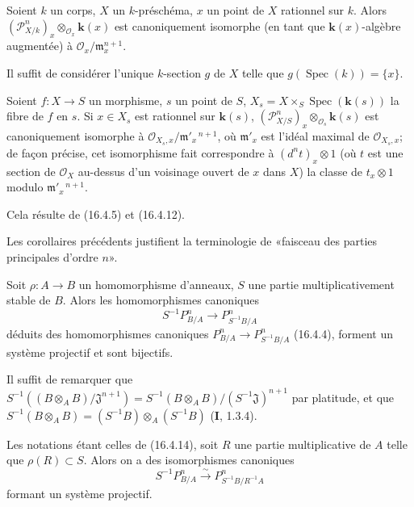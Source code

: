 \begin{corollary}[16.4.12]
\label{IV.16.4.12}
Soient $k$ un corps, $X$ un $k$-préschéma, $x$ un point de $X$ \textup{rationnel sur}
$k$. Alors $(\mathscr{P}_{X/k}^n)_x\otimes_{\mathcal{O}_x}\boldsymbol{k}(x)$ est
canoniquement isomorphe (en tant que $\boldsymbol{k}(x)$-algèbre augmentée) à
$\mathcal{O}_x/\mathfrak{m}_x^{n+1}$.
\end{corollary}

Il suffit de considérer l'unique $k$-section $g$ de $X$ telle que
$g(\operatorname{Spec}(k))=\{x\}$.

\begin{corollary}[16.4.13]
\label{IV.16.4.13}
Soient $f:X\to S$ un morphisme, $s$ un point de $S$,
$X_s=X\times_S\operatorname{Spec}(\boldsymbol{k}(s))$ la fibre de $f$ en $s$. Si
$x\in X_s$ est \textup{rationnel sur} $\boldsymbol{k}(s)$,
$(\mathscr{P}_{X/S}^n)_x\otimes_{\mathcal{O}_s}\boldsymbol{k}(s)$ est canoniquement
isomorphe à $\mathcal{O}_{X_s,x}/\mathfrak{m}'_x{}^{\,n+1}$, où
$\mathfrak{m}'_x$ est l'idéal maximal de $\mathcal{O}_{X_s,x}$; de façon
précise, cet isomorphisme fait correspondre à $(d^n t)_x\otimes1$ \textup{(où $t$ est
une section de $\mathcal{O}_X$ au-dessus d'un voisinage ouvert de $x$ dans
$X$)} la classe de $t_x\otimes1$ modulo $\mathfrak{m}'_x{}^{\,n+1}$.
\end{corollary}

Cela résulte de (16.4.5) et (16.4.12).

Les corollaires précédents justifient la terminologie de «faisceau des parties
principales d'ordre $n$».

\begin{proposition}[16.4.14]
\label{IV.16.4.14}
Soit $\rho:A\to B$ un homomorphisme d'anneaux, $S$ une partie
multiplicativement stable de $B$. Alors les homomorphismes canoniques
\[
  S^{-1}P_{B/A}^n\longrightarrow P_{S^{-1}B/A}^n
  \tag{16.4.14.1}
  \label{IV.16.4.14.1}
\]
déduits des homomorphismes canoniques
$P_{B/A}^n\to P_{S^{-1}B/A}^n$ \textup{(16.4.4)}, forment un système projectif et sont
bijectifs.
\end{proposition}

Il suffit de remarquer que
$S^{-1}((B\otimes_A B)/\mathfrak{J}^{n+1})
=S^{-1}(B\otimes_A B)/(S^{-1}\mathfrak{J})^{n+1}$
par platitude, et que
$S^{-1}(B\otimes_A B)=(S^{-1}B)\otimes_A(S^{-1}B)$ (\textbf{I}, 1.3.4).

\begin{corollary}[16.4.15]
\label{IV.16.4.15}
Les notations étant celles de \textup{(16.4.14)}, soit $R$ une partie multiplicative de
$A$ telle que $\rho(R)\subset S$. Alors on a des isomorphismes canoniques
\[
  S^{-1}P_{B/A}^n\xrightarrow{\sim}P_{S^{-1}B/R^{-1}A}^n
  \tag{16.4.15.1}
  \label{IV.16.4.15.1}
\]
formant un système projectif.
\end{corollary}

